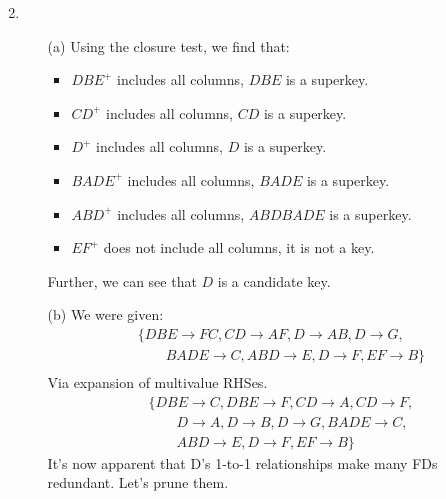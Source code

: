\documentclass{article}
\begin{document}
\begin{enumerate}
\begin{enumerate}
\begin{itemize}
\begin{equation*}
            \end{equation*}
        \end{itemize}
    \end{enumerate}
\item
    \begin{enumerate}
    \item [(a)] Using the closure test, we find that:
        \begin{itemize}
        \item $DBE^+$ includes all columns, $DBE$ is a superkey.
        \item $CD^+$ includes all columns, $CD$ is a superkey.
        \item $D^+$ includes all columns, $D$ is a superkey.
        \item $BADE^+$ includes all columns, $BADE$ is a superkey.
        \item $ABD^+$ includes all columns, $ABDBADE$ is a superkey.
        \item $EF^+$ does not include all columns, it is not a key.
        \end{itemize}
        Further, we can see that $D$ is a candidate key.
    \item [(b)] We were given:
            \begin{equation*}
            \begin{aligned}
            & \big\{DBE \rightarrow FC, CD \rightarrow AF, D \rightarrow AB, D \rightarrow G, \\
            & \qquad BADE \rightarrow C, ABD \rightarrow E, D \rightarrow F, EF \rightarrow B \big\} \\
            \end{aligned}
            \end{equation*}
        Via expansion of multivalue RHSes.
            \begin{equation*}
            \begin{aligned}
            & \big\{DBE \rightarrow C, DBE \rightarrow F, CD \rightarrow A, CD \rightarrow F, \\
            & \qquad D \rightarrow A, D \rightarrow B, D \rightarrow G, BADE \rightarrow C, \\
            & \qquad ABD \rightarrow E, D \rightarrow F, EF \rightarrow B \big\}
            \end{aligned}
            \end{equation*}
        It's now apparent that D's 1-to-1 relationships make many FDs redundant. Let's prune them.
            \begin{equation*}

\end{equation*}
\end{enumerate}
\end{enumerate}
\end{document}
